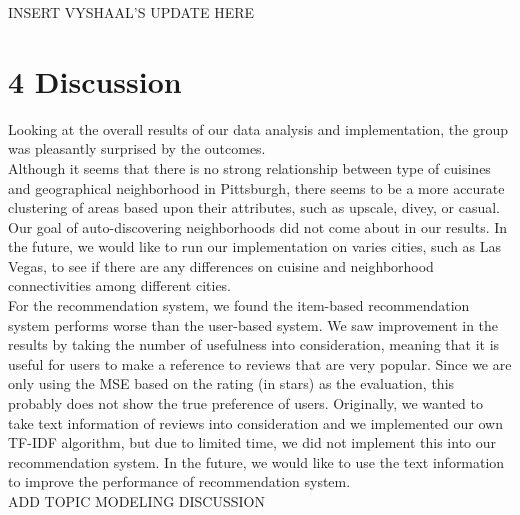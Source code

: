 \documentclass{neu_handout}
\begin{document}
INSERT VYSHAAL'S UPDATE HERE	


\section*{4 Discussion}

Looking at the overall results of our data analysis and implementation, the group was pleasantly surprised by the
outcomes.\\
Although it seems that there is no strong relationship between type of cuisines and geographical neighborhood in Pittsburgh, there seems to be a more accurate clustering of areas based upon their attributes, such as upscale, divey, or casual. Our goal of auto-discovering neighborhoods did not come about in our results. In the future, we would like to run our implementation on varies cities, such as Las Vegas, to see if there are any differences on
cuisine and neighborhood connectivities among different cities.\\

For the recommendation system, we found the item-based recommendation system performs worse than the user-based system. We saw improvement in the results by taking the number of usefulness into consideration, meaning that it is useful for users to make a reference to reviews that are very popular. Since we are only using the MSE based on the rating (in stars) as the evaluation, this probably does not show the true preference of users. Originally, we wanted to take text information of reviews into consideration and we implemented our own TF-IDF algorithm, but due to limited time, we did not implement this into our recommendation system. In the future, we would like to use the text information to improve the performance of recommendation system.\\

ADD TOPIC MODELING DISCUSSION
\end{document}
